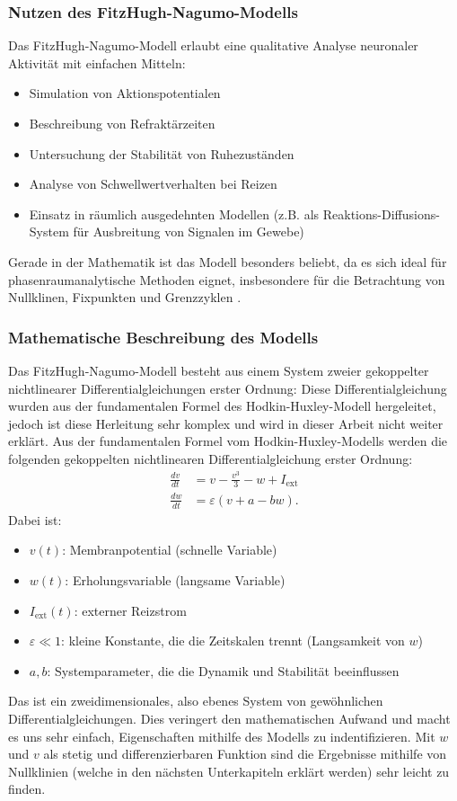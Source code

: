 \begin{refsection}
\subsubsection{Nutzen des FitzHugh-Nagumo-Modells}
Das FitzHugh-Nagumo-Modell erlaubt eine qualitative Analyse neuronaler Aktivität mit einfachen Mitteln:
\begin{itemize}
    \item Simulation von Aktionspotentialen
    \item Beschreibung von Refraktärzeiten
    \item Untersuchung der Stabilität von Ruhezuständen
    \item Analyse von Schwellwertverhalten bei Reizen
    \item Einsatz in räumlich ausgedehnten Modellen (z.B. als Reaktions-Diffusions-System für Ausbreitung von Signalen im Gewebe)
\end{itemize}

Gerade in der Mathematik ist das Modell besonders beliebt, da es sich ideal für phasenraumanalytische Methoden eignet,
insbesondere für die Betrachtung von Nullklinen, Fixpunkten und Grenzzyklen 
\cite{nerven:InaLammers.31.08.2015}.
\subsubsection{Mathematische Beschreibung des Modells}
Das FitzHugh-Nagumo-Modell besteht aus einem System zweier gekoppelter nichtlinearer Differentialgleichungen erster Ordnung:
Diese Differentialgleichung wurden aus der fundamentalen Formel des Hodkin-Huxley-Modell hergeleitet, jedoch ist diese Herleitung sehr komplex und wird in dieser Arbeit nicht weiter erklärt. Aus der fundamentalen Formel vom Hodkin-Huxley-Modells werden die folgenden gekoppelten nichtlinearen Differentialgleichung erster Ordnung:
\[
\begin{aligned}
	\frac{dv}{dt} &= v - \frac{v^3}{3} - w + I_{\text{ext}} \\
	\frac{dw}{dt} &= \varepsilon (v + a - b w).
\end{aligned}
\]
\noindent
Dabei ist:

\begin{itemize}
	\item $v(t)$: Membranpotential (schnelle Variable)
	\item $w(t)$: Erholungsvariable (langsame Variable)
	\item $I_{\text{ext}}(t)$: externer Reizstrom
	\item $\varepsilon \ll 1$: kleine Konstante, die die Zeitskalen trennt (Langsamkeit von $w$)
	\item $a, b$: Systemparameter, die die Dynamik und Stabilität beeinflussen
\end{itemize}
Das ist ein zweidimensionales, also ebenes System von gewöhnlichen Differentialgleichungen. Dies veringert den mathematischen Aufwand und macht es uns sehr einfach, Eigenschaften mithilfe des Modells zu indentifizieren.
Mit $w$ und $v$ als stetig und differenzierbaren Funktion sind die Ergebnisse mithilfe von Nullklinien (welche in den nächsten Unterkapiteln erklärt werden) sehr leicht zu finden.


\end{refsection}
